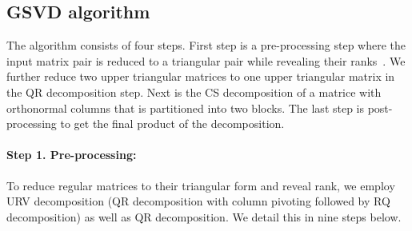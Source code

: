  \subsection{GSVD algorithm} \label{alg}
The algorithm consists of four steps. First step 
is a pre-processing step where the input matrix pair is
reduced to a triangular pair while revealing their ranks~\cite{bai1993new}.
We further reduce two upper triangular matrices to one upper triangular matrix in the QR decomposition step. Next is the CS decomposition of a matrice with orthonormal columns that is partitioned into two blocks. \cite{van1976generalizing} The last step is post-processing to get the final product of the decomposition. 
    
\paragraph{Step 1. Pre-processing:}
To reduce regular matrices to their triangular form and reveal rank, we employ URV decomposition (QR decomposition with column pivoting followed by RQ decomposition) \cite{golub2013matrix} as well as QR decomposition. We detail this in nine steps below.
            
